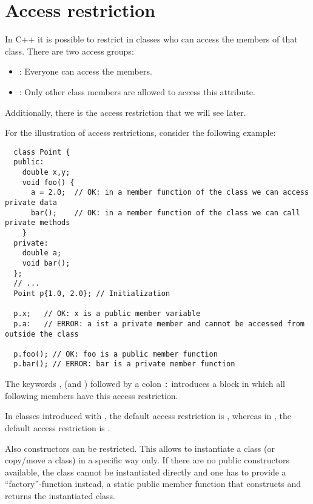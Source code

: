\section{Access restriction\label{sec:access-restriction}}
In C++ it is possible to restrict in classes who can access the members of that class. There are two access groups:
\begin{itemize}
	\item {}: Everyone can access the members.
	\item {}: Only other class members are allowed to access this attribute.
\end{itemize}
Additionally, there is the access restriction  that we will see later.

\begin{example}
  For the illustration of access restrictions, consider the following example:
  \begin{verbatim}
  class Point {
  public:
    double x,y;
    void foo() {
      a = 2.0;  // OK: in a member function of the class we can access private data
      bar();    // OK: in a member function of the class we can call private methods
    }
  private:
    double a;
    void bar();
  };
  // ...
  Point p{1.0, 2.0}; // Initialization

  p.x;   // OK: x is a public member variable
  p.a:   // ERROR: a ist a private member and cannot be accessed from outside the class

  p.foo(); // OK: foo is a public member function
  p.bar(); // ERROR: bar is a private member function
  \end{verbatim}
\end{example}

The keywords ,  (and ) followed by a colon \texttt{:} introduces a block in which all following members
have this access restriction.

\begin{rem}
  In classes introduced with , the default access restriction is , whereas in , the default access restriction is
  .
\end{rem}

\begin{rem}
  Also constructors can be restricted. This allows to instantiate a class (or copy/move a class) in a specific way only. If there are no public
  constructors available, the class cannot be instantiated directly and one has to provide a ``factory''-function instead, \ie a static public
  member function that constructs and returns the instantiated class.
\end{rem}



